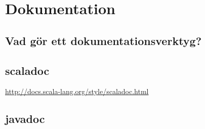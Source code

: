 
\chapter{Dokumentation}

\section{Vad gör ett dokumentationsverktyg?}

\section{scaladoc}


\url{http://docs.scala-lang.org/style/scaladoc.html}

\section{javadoc}
